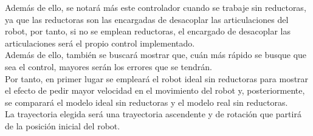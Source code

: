 Además de ello, se notará más este controlador cuando se trabaje sin reductoras, ya que las reductoras son las encargadas de desacoplar las articulaciones del robot, por tanto, si no se emplean reductoras, el encargado de desacoplar las articulaciones será el propio control implementado. \\

Además de ello, también se buscará mostrar que, cuán más rápido se busque que sea el control, mayores serán los errores que se tendrán.\\



Por tanto, en primer lugar se empleará el robot ideal sin reductoras para mostrar el efecto de pedir mayor velocidad en el movimiento del robot y, posteriormente, se comparará el modelo ideal sin reductoras y el modelo real sin reductoras.\\

La trayectoria elegida será una trayectoria ascendente y de rotación que partirá de la posición inicial del robot.




